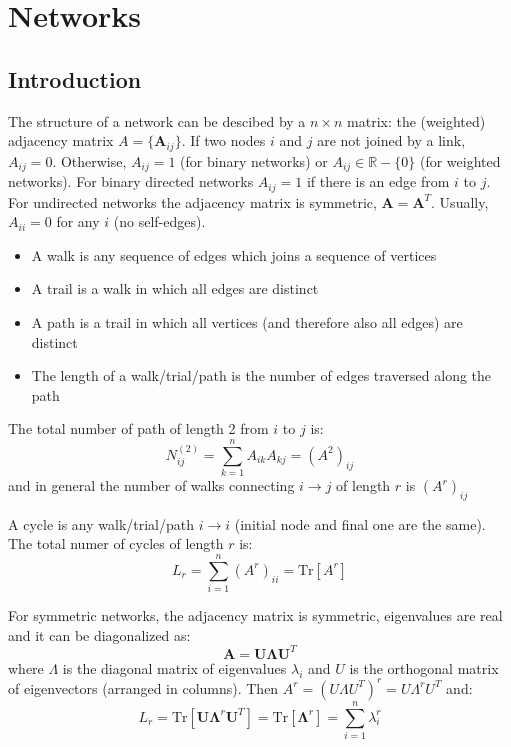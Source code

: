 \chapter{Networks}
\label{chap:networks}
\section{Introduction}
The structure of a network can be descibed by a $n \times n$ matrix: the (weighted) adjacency matrix $A = \{\mathbf{A}_{ij}\}$. If two nodes $i$ and $j$ are not joined by a link, $A_{ij} = 0$. Otherwise, $A_{ij} = 1$ (for binary networks) or $A_{ij} \in \mathbb{R} - \{0\}$ (for weighted networks). For binary directed networks $A_{ij} = 1$ if there is an edge from $i$ to $j$. For undirected networks the adjacency matrix is symmetric, $\mathbf{A} = \mathbf{A}^T$. Usually, $A_{ii} = 0$ for any $i$ (no self-edges).
\begin{mydefinition}
 \begin{itemize}
 	\item A walk is any sequence of edges which joins a sequence of vertices
 	\item A trail is a walk in which all edges are distinct
 	\item A path is a trail in which all vertices (and therefore also all edges) are distinct
 	\item The length of a walk/trial/path is the number of edges traversed along the path
 \end{itemize}
\end{mydefinition}
The total number of path of length 2 from $i$ to $j$ is:
\[
N_{ij}^{(2)} = \sum_{k=1}^{n} A_{ik}A_{kj} = (A^2)_{ij}
\]
and in general the number of walks connecting $i \to j$ of length $r$ is $(A^r)_{ij}$
\newpage
\begin{mydefinition}[Cycles]
A cycle is any walk/trial/path $i \to i$ (initial node and final one are the same). The total numer of cycles of length $r$ is:
\[
L_r = \sum_{i =1}^{n} (A^r)_{ii} = \text{Tr}[A^r]
\]
\end{mydefinition}
For symmetric networks, the adjacency matrix is symmetric, eigenvalues are real and it can be diagonalized as:
\[
\mathbf{A} = \mathbf{U}\mathbf{\Lambda} \mathbf{U}^T
\]
where $\Lambda$ is the diagonal matrix of eigenvalues $\lambda_i$ and $U$ is the orthogonal matrix of eigenvectors (arranged in columns). Then $A^r = (U\Lambda U^T)^r = U\Lambda^rU^T$ and:
\[
L_r = \text{Tr}[\mathbf{U}\mathbf{\Lambda}^r\mathbf{U}^T] = \text{Tr}[\mathbf{\Lambda}^r] = \sum_{i=1}^n \lambda_i^r 
\]
